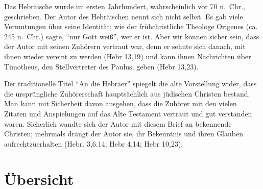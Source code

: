 \documentclass[
  12pt,
]{krantz}
\begin{document}
Das Hebräische wurde im ersten Jahrhundert, wahrscheinlich vor 70 n.~Chr., geschrieben. Der Autor des Hebräischen nennt sich nicht selbst. Es gab viele Vermutungen über seine Identität; wie der frühchristliche Theologe Origenes (ca. 245 n.~Chr.) sagte, ``nur Gott weiß'', wer er ist. Aber wir können sicher sein, dass der Autor mit seinen Zuhörern vertraut war, denn er sehnte sich danach, mit ihnen wieder vereint zu werden (Hebr 13,19) und kann ihnen Nachrichten über Timotheus, den Stellvertreter des Paulus, geben (Hebr 13,23).

Der traditionelle Titel ``An die Hebräer'' spiegelt die alte Vorstellung wider, dass die ursprüngliche Zuhörerschaft hauptsächlich aus jüdischen Christen bestand. Man kann mit Sicherheit davon ausgehen, dass die Zuhörer mit den vielen Zitaten und Anspielungen auf das Alte Testament vertraut und gut verstanden waren. Sicherlich wandte sich der Autor mit diesem Brief an bekennende Christen; mehrmals drängt der Autor sie, ihr Bekenntnis und ihren Glauben aufrechtzuerhalten (Hebr. 3,6.14; Hebr 4,14; Hebr 10,23).

\hypertarget{uxfcbersicht}{%
\section{Übersicht}\label{uxfcbersicht}}
\end{document}
